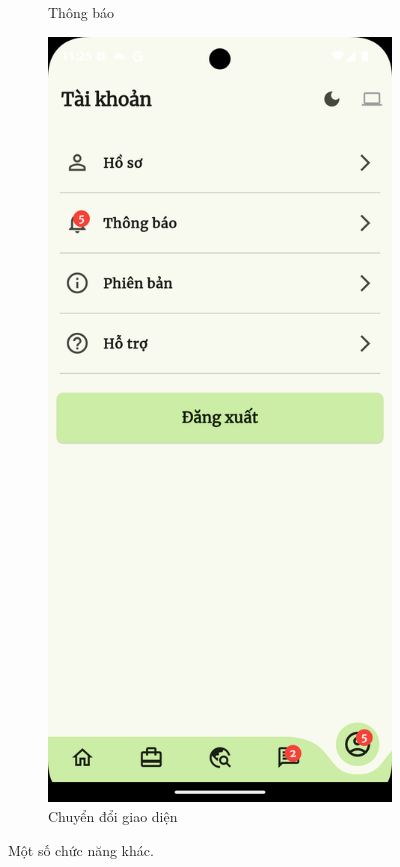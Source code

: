\begin{figure}[H]
\begin{subfigure}{0.326\textwidth}
        \caption{Thông báo}
        \label{fig:func_noti}
    \end{subfigure}
    \hfill
    \begin{subfigure}{0.326\textwidth}
        \includegraphics[width=1\linewidth]{figures/c4/system_func/theme.png}
        \caption{Chuyển đổi giao diện}
        \label{fig:func_theme}
    \end{subfigure}
    \caption{Một số chức năng khác.}
    \label{fig:other-functions}
\end{figure}